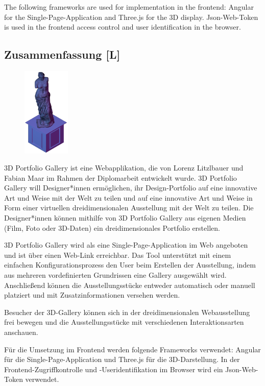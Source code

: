 The following frameworks are used for implementation in the frontend: Angular for the Single-Page-Application and Three.js for the 3D display. Json-Web-Token is used in the frontend access control and user identification in the browser.
\newpage
\begin{spacing}{1}
    \chapter*{Zusammenfassung [L]}
\end{spacing}
\begin{figure}
    \begin{center}
      \includegraphics[width=0.2\textwidth]{pics/statue.png}
    \end{center}
\end{figure}
3D Portfolio Gallery ist eine Webapplikation, die von Lorenz Litzlbauer und Fabian Maar im Rahmen der Diplomarbeit entwickelt wurde. 3D Portfolio Gallery will Designer*innen ermöglichen, ihr Design-Portfolio auf eine innovative Art und Weise mit der Welt zu teilen und auf eine innovative Art und Weise in Form einer virtuellen dreidimensionalen Ausstellung mit der Welt zu teilen. Die Designer*innen können mithilfe von 3D Portfolio Gallery aus eigenen Medien (Film, Foto oder 3D-Daten) ein dreidimensionales Portfolio erstellen.

3D Portfolio Gallery wird als eine Single-Page-Application im Web angeboten und ist über einen Web-Link erreichbar. Das Tool unterstützt mit einem einfachen Konfigurationsprozess den User beim Erstellen der Ausstellung, indem aus mehreren vordefinierten Grundrissen eine Gallery ausgewählt wird. Anschließend können die Ausstellungsstücke entweder automatisch oder manuell platziert und mit Zusatzinformationen versehen werden.

Besucher der 3D-Gallery können sich in der dreidimensionalen Webausstellung frei bewegen und die Ausstellungsstücke mit verschiedenen Interaktionsarten anschauen.

Für die Umsetzung im Frontend werden folgende Frameworks verwendet: Angular für die Single-Page-Application und Three.js für die 3D-Darstellung. In der Frontend-Zugriffkontrolle und -Useridentifikation im Browser wird ein Json-Web-Token verwendet.